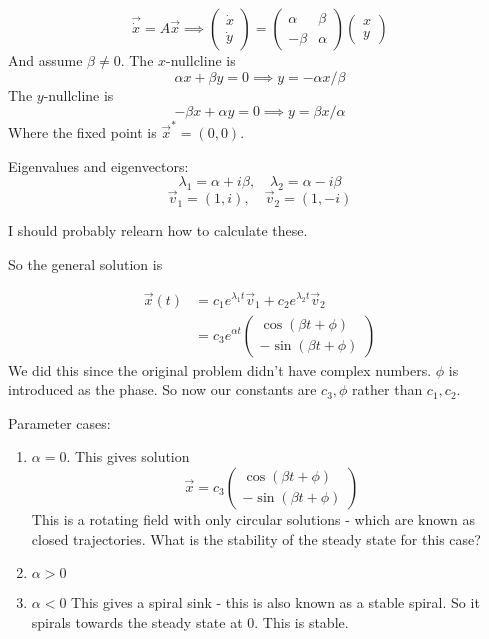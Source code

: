 \documentclass{X:/Documents/Coding/Latex/myassignment}
\begin{document}
\[\vec{\dot x} = A\vec x \implies 
\begin{pmatrix}\dot x\\\dot y\end{pmatrix} =
\begin{pmatrix}\alpha & \beta \\-\beta &\alpha \end{pmatrix}
\begin{pmatrix}x\\y\end{pmatrix}
\]
And assume $\beta \neq 0$.
The $x$-nullcline is 
\[\alpha x + \beta y = 0 \implies y = -\alpha x/\beta\]
The $y$-nullcline is
\[-\beta x + \alpha y = 0 \implies y = \beta x/\alpha\]
Where the fixed point is $\vec x^* = (0,0)$.

Eigenvalues and eigenvectors:
\[\lambda_1 = \alpha + i\beta, \quad \lambda_2 = \alpha - i\beta\]
\[\vec v_1 = (1,i), \quad \vec v_2 = (1,-i)\]

I should probably relearn how to calculate these.

So the general solution is

\begin{align*}
    \vec x(t) &= c_1 e^{\lambda_1 t} \vec v_1 + c_2 e^{\lambda_2 t} \vec v_2\\
    &= c_3 e^{\alpha t} \begin{pmatrix}
    \cos(\beta t + \phi)\\ -\sin (\beta t + \phi)
    \end{pmatrix}
\end{align*}
We did this since the original problem didn't have complex numbers. $\phi$ is introduced as the phase. So now our constants are $c_3,\phi$ rather than $c_1,c_2$.

Parameter cases:
\begin{enumerate}
    \item $\alpha = 0$. This gives solution
    \[\vec x = c_3 \begin{pmatrix}\cos(\beta t + \phi)\\ -\sin (\beta t + \phi) \end{pmatrix}\]
    This is a rotating field with only circular solutions - which are known as closed trajectories. What is the stability of the steady state for this case?

    \item $\alpha > 0$

    \item $\alpha < 0$ This gives a spiral sink - this is also known as a stable spiral. So it spirals towards the steady state at $0$. This is stable.

\end{enumerate}
\end{document}
